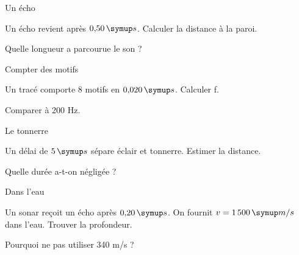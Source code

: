 \par\noindent\begin{minipage}{\linewidth}
\begin{exercice}[2]{Un écho}
\begin{questions}
\item Un écho revient après $0{,}50\unite s$. Calculer la distance à la paroi.
\item Quelle longueur a parcourue le son ?
\end{questions}
\end{exercice}
\end{minipage}
\par\noindent\begin{minipage}{\linewidth}
\begin{exercice}[2]{Compter des motifs}
\begin{questions}
\item Un tracé comporte $8$ motifs en $0{,}020\unite s$. Calculer f.
\item Comparer à 200 Hz.
\end{questions}
\end{exercice}
\end{minipage}
\par\noindent\begin{minipage}{\linewidth}
\begin{exercice}[2]{Le tonnerre}
\begin{questions}
\item Un délai de $5\unite s$ sépare éclair et tonnerre. Estimer la distance.
\item Quelle durée a-t-on négligée ?
\end{questions}
\end{exercice}
\end{minipage}
\par\noindent\begin{minipage}{\linewidth}
\begin{exercice}[2]{Dans l’eau}
\begin{questions}
\item Un sonar reçoit un écho après $0{,}20\unite s$. On fournit $v=1\,500\unite{m/s}$ dans l’eau. Trouver la profondeur.
\item Pourquoi ne pas utiliser 340 m/s ?
\end{questions}
\end{exercice}
\end{minipage}
